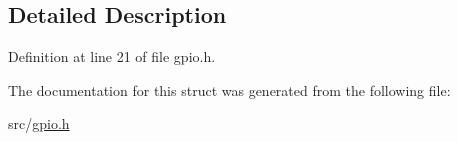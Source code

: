 \subsection{Detailed Description}


Definition at line 21 of file gpio.\+h.



The documentation for this struct was generated from the following file\+:\begin{DoxyCompactItemize}
\item 
src/\hyperlink{gpio_8h}{gpio.\+h}\end{DoxyCompactItemize}
